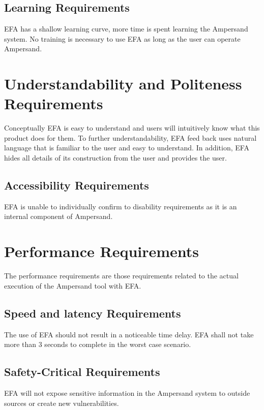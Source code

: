\subsection{Learning Requirements}\label{subsec:LearningReq}
EFA has a shallow learning curve, more time is spent learning the Ampersand 
system. No training is necessary to use EFA as long as the user can operate 
Ampersand.

\section{Understandability and Politeness 
Requirements}\label{sec:Understandability}
Conceptually EFA is easy to understand and users will intuitively know what 
this product does for them. To further understandability, EFA feed back uses 
natural language that is familiar to the user and easy to understand. In 
addition, EFA hides all details of its construction from the user and provides 
the user. 

\subsection{Accessibility Requirements}\label{Accessibility}
EFA is unable to individually confirm to disability requirements as it is an 
internal component of Ampersand.

\section{Performance Requirements}\label{sec:Performance}
The performance requirements are those requirements related to the actual
execution of the Ampersand tool with EFA.  

\subsection{Speed and latency Requirements}\label{subsec:SpeedReq}
The use of EFA should not result in a noticeable time delay. EFA shall 
not take more than 3 seconds to complete in the worst case scenario.

\subsection{Safety-Critical Requirements}\label{subec:SafetyReq}
EFA will not expose sensitive information in the Ampersand system to outside 
sources or create new vulnerabilities.


